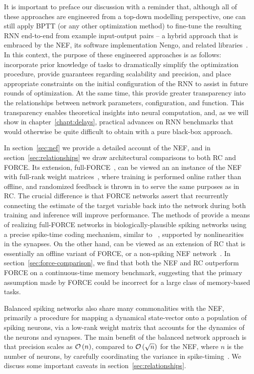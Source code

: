 It is important to preface our discussion with a reminder that, although all of these approaches are engineered from a top-down modelling perspective, one can still apply BPTT (or any other optimization method) to fine-tune the resulting RNN end-to-end from example input-output pairs -- a hybrid approach that is embraced by the NEF, its software implementation Nengo, and related libraries~\citep{rasmussen2018nengodl, hazan2018bindsnet}.
In this context, the purpose of these engineered approaches is as follows: incorporate prior knowledge of tasks to dramatically simplify the optimization procedure, provide guarantees regarding scalability and precision, and place appropriate constraints on the initial configuration of the RNN to assist in future rounds of optimization.
At the same time, this provide greater transparency into the relationships between network parameters, configuration, and function.
This transparency enables theoretical insights into neural computation, and, as we will show in chapter~\ref{chapt:delays}, practical advances on RNN benchmarks that would otherwise be quite difficult to obtain with a pure black-box approach.

In section~\ref{sec:nef} we provide a detailed account of the NEF, and in section~\ref{sec:relationships} we draw architectural comparisons to both RC and FORCE.
Its extension, full-FORCE~\citep{depasquale2018full}, can be viewed an an instance of the NEF with full-rank weight matrices~\citep{tripp2006neural}, where training is performed online rather than offline, and randomized feedback is thrown in to serve the same purposes as in RC.
The crucial difference is that FORCE networks assert that recurrently connecting the estimate of the target variable back into the network during both training and inference will improve performance. 
The methods of \citet{thalmeier2016learning} provide a means of realizing full-FORCE networks in biologically-plausible spiking networks using a precise spike-time coding mechanism, similar to ~\citet{boerlin2013predictive}, supported by nonlinearities in the synapses.
On the other hand, \citet{jaeger2014controlling} can be viewed as an extension of RC that is essentially an offline variant of FORCE, or a non-spiking NEF network~\citep{aubin2017}.
In section~\ref{sec:force-comparison}, we find that both the NEF and RC outperform FORCE on a continuous-time memory benchmark, suggesting that the primary assumption made by FORCE could be incorrect for a large class of memory-based tasks.

Balanced spiking networks also share many commonalities with the NEF, primarily a procedure for mapping a dynamical state-vector onto a population of spiking neurons, via a low-rank weight matrix that accounts for the dynamics of the neurons and synapses.
The main benefit of the balanced network approach is that precision scales as $\mathcal{O}\left({n}\right)$, compared to $\mathcal{O}\left({\sqrt{n}}\right)$ for the NEF, where $n$ is the number of neurons, by carefully coordinating the variance in spike-timing~\citep[][Figure~11]{boahen2017neuromorph}.
We discuss some important caveats in section~\ref{sec:relationships}.

